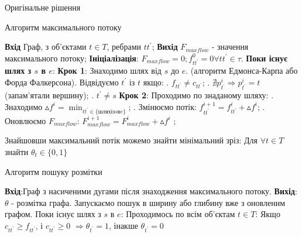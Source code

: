 Оригінальне рішення 

\begin{algorithm}
    \caption{Алгоритм максимального потоку}
    \begin{algorithmic}
    \State \textbf{Вхід} Граф, з об'єктами $t \in T$, ребрами $tt^{'}$;
    \State \textbf{Вихід} $F_{maxflow}$ - значення максимального потоку;
    \State \textbf{Ініціалізація}: $F_{maxflow} = 0; f_{tt^{'}}^{0} = 0 \forall tt^{'}  \in \tau$.
    \State \textbf{Поки існує шлях з $s$ в $e$}:    
    \State \textbf{Крок 1}: Знаходимо шлях від $s$ до $e$.
    (алгоритм Едмонса-Карпа або Форда Фалкерсона).
    \State Відвідуємо $t^{'}$ із $t$ якщо:
            \State {}. $f_{tt^{'}} \neq   c_{tt^{'}}$;
            \State {}. $ \nexists p_{t^{'}}^{i} \Rightarrow  p_{t^{'}}^{i} = t $ (запам'ятали вершину);
            \State {}. $ t^{'} \neq s $
    \State \textbf{Крок 2}: Проходимо по знаданому шляху: 
            \State {}. Знаходимо $ \vartriangle f^{i} = \min_{tt^{'} \in \{шлях із s в e \}} $;
            \State {}. Змінюємо потік: $ f_{tt^{'}}^{i+1} = f_{tt^{'}}^{i} + \vartriangle f^{i} $;
            \State {}. Оновлюємо $F_{maxflow}$: $ F_{maxflow}^{i+1}  = F_{maxflow}^{i} + \vartriangle f^{i} $ ;
    \end{algorithmic}
\end{algorithm}

Знайшовши максимальний потік можемо знайти мінімальний зріз:
Для $\forall t \in T$ знайти $\theta_{t} \in \{0,1\}$
\begin{algorithm}
    \caption{Алгоритм пошуку розмітки}
    \begin{algorithmic}
    \State \textbf{Вхід}:Граф з насиченими дугами після знаходження максимального потоку.
    \State \textbf{Вихід}: $\theta$ - розмітка графа.
    \State Запускаємо пошук в ширину або глибину вже з оновленим графом.
    \State Поки існує шлях з $s$ в $e$:
    \State Проходимось по всім об'єктам $ t \in T $:
    \State \qquad Якщо $c_{tt^{'}} \geqslant f_{tt^{'}}$, і $c_{tt^{'}} \geqslant 0$
    $\Rightarrow \theta_{t^{'}} = 1 $,
    \State \qquad інакше $\theta_{t^{'}} = 0 $

    \end{algorithmic}
\end{algorithm}